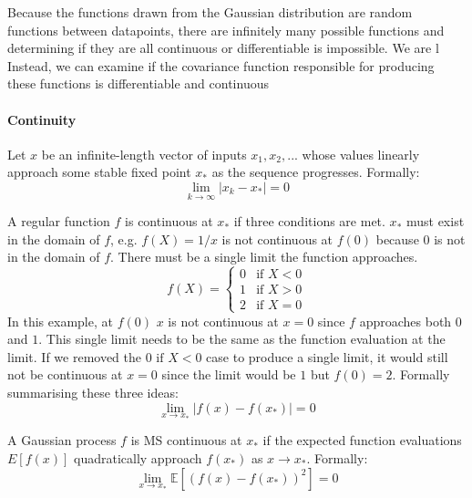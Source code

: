 Because the functions drawn from the Gaussian distribution are random functions between datapoints, there are infinitely many possible functions and determining if they are all continuous or differentiable is impossible. We are l
Instead, we can examine if the covariance function responsible for producing these functions is differentiable and continuous

\paragraph{Continuity}
Let $x$ be an infinite-length vector of inputs $x_1, x_2, ...$ whose values linearly approach some stable fixed point $x_*$ as the sequence progresses. Formally:
\begin{equation*}
    \lim_{k \to \infty} |x_k - x_*| = 0
\end{equation*}

A regular function $f$ is continuous at $x_*$ if three conditions are met. $x_*$ must exist in the domain of $f$, e.g. $f(X) = 1/x$ is not continuous at $f(0)$ because $0$ is not in the domain of $f$. There must be a single limit the function approaches.
\begin{equation*}
    f(X) = \begin{cases}
        0 & \text{if } X < 0 \\
        1 & \text{if } X > 0 \\
        2 & \text{if } X = 0
    \end{cases}
\end{equation*}
In this example, at $f(0)$ $x$ is not continuous at $x = 0$ since $f$ approaches both $0$ and $1$. This single limit needs to be the same as the function evaluation at the limit. If we removed the $0 \text{ if } X < 0$ case to produce a single limit, it would still not be continuous at $x = 0$ since the limit would be $1$ but $f(0) = 2$. Formally summarising these three ideas:
\begin{equation*}
    \lim_{x \to x_*} |f(x) - f(x_*)| = 0
\end{equation*}

A Gaussian process $f$ is MS continuous at $x_*$ if the expected function evaluations $E[f(x)]$ quadratically approach $f(x_*)$ as $x \to x_*$. Formally:
\begin{equation*}
    \lim_{x \to x_*} \mathbb{E}[(f(x) - f(x_*))^2] = 0
\end{equation*}

